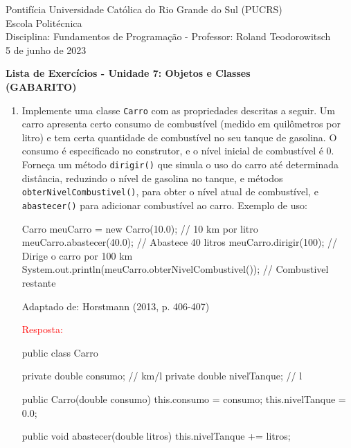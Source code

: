 \documentclass[onecolumn,a4paper,10pt]{report}
\newcommand{\+}{\, + \,}
\newcommand{\<}{\hspace*{-0.4cm}}
\begin{document}
\singlespacing

\begin{center}
Pontifícia Universidade Católica do Rio Grande do Sul (PUCRS)\\
Escola Politécnica\\
Disciplina: Fundamentos de Programação - Professor: Roland Teodorowitsch\\
5 de junho de 2023
\end{center}

\begin{center}
\textbf{Lista de Exercícios - Unidade 7: Objetos e Classes\\(GABARITO)}
\end{center}

\begin{enumerate}

\item Implemente uma classe \texttt{Carro} com as propriedades descritas a seguir. Um carro apresenta certo consumo
de combustível (medido em quilômetros por litro) e tem certa quantidade de combustível no seu tanque de gasolina.
O consumo é especificado no construtor, e o nível inicial de combustível é 0. Forneça um método \texttt{dirigir()}
que simula o uso do carro até determinada distância, reduzindo o nível de gasolina no tanque, e métodos
\texttt{obterNivelCombustivel()}, para obter o nível atual de combustível, e \texttt{abastecer()} para adicionar combustível ao carro.
Exemplo de uso:\\
\begin{javacode}
Carro meuCarro = new Carro(10.0);   // 10 km por litro
meuCarro.abastecer(40.0);           // Abastece 40 litros
meuCarro.dirigir(100);              // Dirige o carro por 100 km
System.out.println(meuCarro.obterNivelCombustivel()); // Combustivel restante
\end{javacode}
{\tiny Adaptado de: Horstmann (2013, p. 406-407)}\\
{\tiny \textcolor{red}{Resposta:}\\
\begin{javacode}
public class Carro {
    private double consumo;     // km/l
    private double nivelTanque; // l
    
    public Carro(double consumo) {
        this.consumo = consumo;
        this.nivelTanque = 0.0;
    }
    
    public void abastecer(double litros) {
        this.nivelTanque += litros;
    }
    
}
\end{javacode}}
\end{enumerate}
\end{document}
